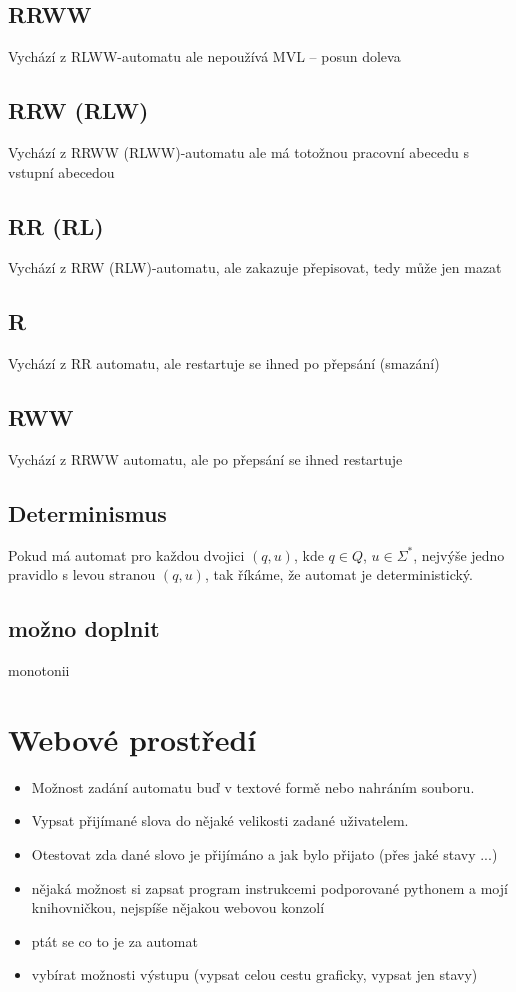 \documentclass{article}
\begin{document}
\subsection{RRWW}
Vychází z RLWW-automatu ale nepoužívá MVL -- posun doleva
\subsection{RRW (RLW)}
Vychází z RRWW (RLWW)-automatu ale má totožnou pracovní abecedu s vstupní abecedou
\subsection{RR (RL)}
Vychází z RRW (RLW)-automatu, ale zakazuje přepisovat, tedy může jen mazat
\subsection{R}
Vychází z RR automatu, ale restartuje se ihned po přepsání (smazání)
\subsection{RWW}
Vychází z RRWW automatu, ale po přepsání se ihned restartuje

\subsection{Determinismus}
Pokud má automat pro každou dvojici $(q, u)$, kde $q \in Q$, $u \in \Sigma^\ast$,
nejvýše jedno pravidlo s levou stranou $(q, u)$, tak říkáme, že automat je deterministický.

\subsection{možno doplnit}
monotonii

\section{Webové prostředí}
\begin{itemize}
	\item Možnost zadání automatu buď v textové formě nebo nahráním souboru.
	\item Vypsat přijímané slova do nějaké velikosti zadané uživatelem.
	\item Otestovat zda dané slovo je přijímáno a jak bylo přijato (přes jaké stavy ...)
	\item nějaká možnost si zapsat program instrukcemi podporované pythonem a mojí knihovničkou, nejspíše nějakou webovou konzolí
	\item ptát se co to je za automat
	\item vybírat možnosti výstupu (vypsat celou cestu graficky, vypsat jen stavy)
\end{itemize}
\end{document}
